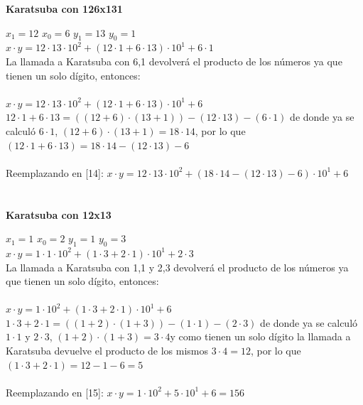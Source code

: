 \documentclass[titlepage,a4paper]{article}
\begin{document}
\textbf{Karatsuba con 126x131} \par
\qquad $x_1=12$ \quad $x_0=6$ \quad $y_1=13$ \quad $y_0=1$ \\
$x\cdot y= 12 \cdot 13 \cdot 10^2 + (12\cdot 1 + 6 \cdot 13)\cdot 10^1 + 6\cdot 1$ \\

La llamada a Karatsuba con 6,1 devolverá el producto de los números ya que tienen un solo dígito, entonces: \\ \\
$x\cdot y= 12 \cdot 13 \cdot 10^2 + (12\cdot 1 + 6 \cdot 13)\cdot 10^1 + 6 $ \qquad [14] \\

$12\cdot 1 + 6 \cdot 13 = ((12+6)\cdot (13+1)) - (12\cdot 13) - (6\cdot 1) $  de donde ya se calculó $6 \cdot 1$, $ (12+6)\cdot (13+1) = 18 \cdot 14 $, por lo que $(12\cdot 1 + 6 \cdot 13) =  18 \cdot 14 - (12\cdot 13) - 6 $ \\ \\
Reemplazando en [14]: \qquad $ x\cdot y= 12 \cdot 13 \cdot 10^2 + (18 \cdot 14 - (12\cdot 13) - 6 )\cdot 10^1 + 6  $ \\ \\ \\


\textbf{Karatsuba con 12x13} \par
\qquad $x_1=1$ \quad $x_0=2$ \quad $y_1=1$ \quad $y_0=3$ \\
$x\cdot y= 1 \cdot 1 \cdot 10^2 + (1\cdot 3 + 2 \cdot 1)\cdot 10^1 + 2\cdot 3 $ \\

La llamada a Karatsuba con 1,1 y 2,3 devolverá el producto de los números ya que tienen un solo dígito, entonces: \\ \\
$x\cdot y = 1 \cdot 10^2 + (1\cdot 3 + 2 \cdot 1)\cdot 10^1 + 6 $ \qquad [15] \\

$1 \cdot3 + 2\cdot1 = ((1+2)\cdot (1+3)) - (1\cdot 1) - (2\cdot 3) $ de donde ya se calculó $1 \cdot 1$ y $ 2 \cdot 3 $, $ (1+2)\cdot (1+3) = 3 \cdot 4 $y como tienen un solo dígito la llamada a Karatsuba devuelve el producto de los mismos $3\cdot4=12$, por lo que $ (1\cdot 3 + 2 \cdot 1) = 12 - 1 - 6 = 5 $ \\ \\ 
Reemplazando en [15]: \qquad $ x\cdot y= 1 \cdot 10^2 + 5\cdot 10^1 + 6 = 156 $ \\ \\
\end{document}
